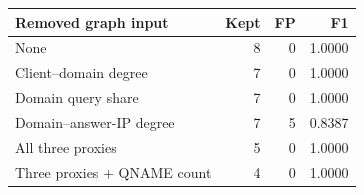 \centering\footnotesize
\begin{tabular}{@{}lrrr@{}}
\toprule
Removed graph input & Kept & FP & F1\\\midrule
None & 8 & 0 & 1.0000\\
Client--domain degree & 7 & 0 & 1.0000\\
Domain query share & 7 & 0 & 1.0000\\
Domain--answer-IP degree & 7 & 5 & 0.8387\\
All three proxies & 5 & 0 & 1.0000\\
Three proxies + QNAME count & 4 & 0 & 1.0000\\
\bottomrule
\end{tabular}
